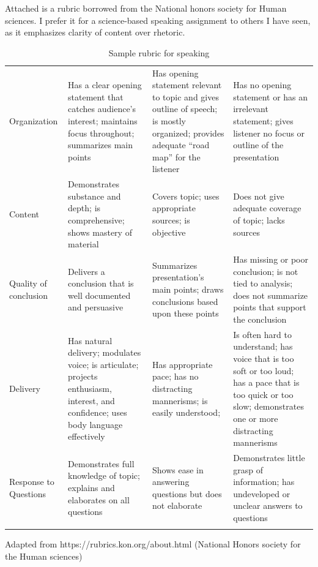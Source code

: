 \begin{refsection}
Attached is a rubric borrowed from the National honors society for Human sciences. I prefer it for a science-based speaking assignment to others I have seen, as it emphasizes clarity of content over rhetoric.

 \begin{longtable}[!t]{ | P{2cm} | P{4cm} | P{4cm} | P{4cm} |}
\hline
{} &  &  &  \\ \hline
Organization&
Has a clear opening statement that catches audience’s interest; maintains focus throughout; summarizes main points&
Has opening statement relevant to topic and gives outline of speech; is mostly organized; provides adequate “road map” for the listener&
Has no opening statement or has an irrelevant statement; gives listener no focus or outline of the presentation \\ \hline
Content&
Demonstrates substance and depth; is comprehensive; shows mastery of material&
Covers topic; uses appropriate sources; is objective&
Does not give adequate coverage of topic; lacks sources \\ \hline
Quality of conclusion&
Delivers a conclusion that is well documented and persuasive&
Summarizes presentation’s main points; draws conclusions based upon these points&
Has missing or poor conclusion; is not tied to analysis; does not summarize points that support the conclusion \\ \hline
Delivery&
Has natural delivery; modulates voice; is articulate; projects enthusiasm, interest, and confidence; uses body language effectively&
Has appropriate pace; has no distracting mannerisms; is easily understood; &
Is often hard to understand; has voice that is too soft or too loud; has a pace that is too quick or too slow; demonstrates one or more distracting mannerisms \\ \hline
Response to Questions&
Demonstrates full knowledge of topic; explains and elaborates on all questions&
Shows ease in answering questions but does not elaborate&
Demonstrates little grasp of information; has undeveloped or unclear answers to questions \\ \hline
\caption{Sample rubric for speaking}
\label{table: speakingrubric}
\end{longtable}


Adapted from https:\slash \slash rubrics.kon.org\slash about.html (National Honors society for the Human sciences) 

\pagebreak 


\end{refsection}
